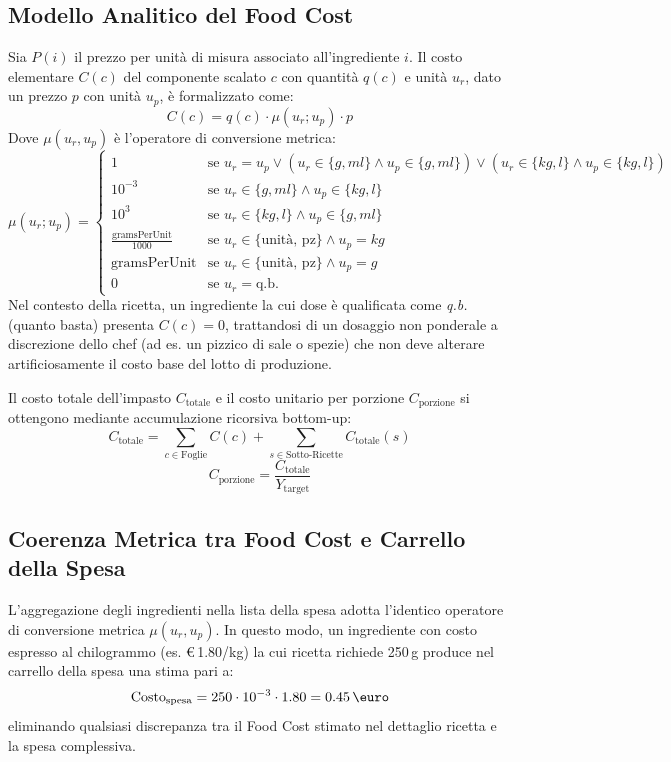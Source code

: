 \documentclass[11pt,a4paper,titlepage]{article}
\begin{document}
\subsection{Modello Analitico del Food Cost}
Sia $P(i)$ il prezzo per unit\`a di misura associato all'ingrediente $i$. Il costo elementare $C(c)$ del componente scalato $c$ con quantit\`a $q(c)$ e unit\`a $u_r$, dato un prezzo $p$ con unit\`a $u_p$, \`e formalizzato come:
$$C(c) = q(c) \cdot \mu(u_r; u_p) \cdot p$$
Dove $\mu(u_r, u_p)$ \`e l'operatore di conversione metrica:
$$
    \mu(u_r; u_p) = 
    \begin{cases}
        1 & \text{se } u_r = u_p \lor (u_r \in \{g, ml\} \land u_p \in \{g, ml\}) \lor (u_r \in \{kg, l\} \land u_p \in \{kg, l\}) \\
        10^{-3} & \text{se } u_r \in \{g, ml\} \land u_p \in \{kg, l\} \\
        10^3 & \text{se } u_r \in \{kg, l\} \land u_p \in \{g, ml\} \\
        \frac{\text{gramsPerUnit}}{1000} & \text{se } u_r \in \{\text{unit\`a, pz}\} \land u_p = kg \\
        \text{gramsPerUnit} & \text{se } u_r \in \{\text{unit\`a, pz}\} \land u_p = g \\
        0 & \text{se } u_r = \text{q.b.}
    \end{cases}
$$
Nel contesto della ricetta, un ingrediente la cui dose \`e qualificata come \textit{q.b.} (quanto basta) presenta $C(c) = 0$, trattandosi di un dosaggio non ponderale a discrezione dello chef (ad es. un pizzico di sale o spezie) che non deve alterare artificiosamente il costo base del lotto di produzione.

Il costo totale dell'impasto $C_{\text{totale}}$ e il costo unitario per porzione $C_{\text{porzione}}$ si ottengono mediante accumulazione ricorsiva bottom-up:
$$C_{\text{totale}} = \sum_{c \in \text{Foglie}} C(c) + \sum_{s \in \text{Sotto-Ricette}} C_{\text{totale}}(s)$$
$$C_{\text{porzione}} = \frac{C_{\text{totale}}}{Y_{\text{target}}}$$

\subsection{Coerenza Metrica tra Food Cost e Carrello della Spesa}
L'aggregazione degli ingredienti nella lista della spesa adotta l'identico operatore di conversione metrica $\mu(u_r, u_p)$. In questo modo, un ingrediente con costo espresso al chilogrammo (es. \euro\,1.80/kg) la cui ricetta richiede 250\,g produce nel carrello della spesa una stima pari a:
$$\text{Costo}_{\text{spesa}} = 250 \cdot 10^{-3} \cdot 1.80 = 0.45\,\text{\euro}$$
eliminando qualsiasi discrepanza tra il Food Cost stimato nel dettaglio ricetta e la spesa complessiva.
\end{document}
